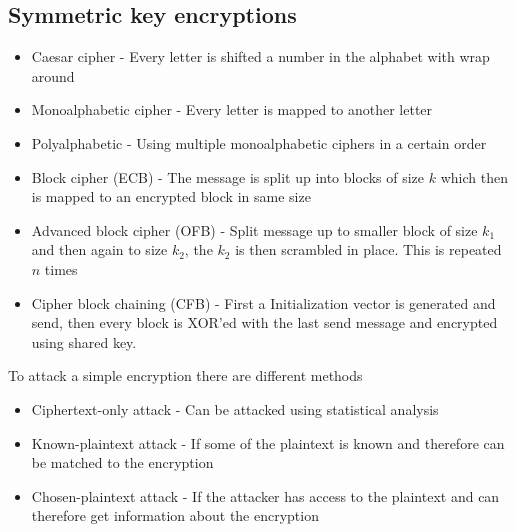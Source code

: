 \documentclass[12pt, a4paper]{article}
\begin{document}
		\subsection{Symmetric key encryptions}
			\begin{itemize}
				\item Caesar cipher - Every letter is shifted a number in the alphabet with wrap around
				\item Monoalphabetic cipher - Every letter is mapped to another letter
				\item Polyalphabetic - Using multiple monoalphabetic ciphers in a certain order
				\item Block cipher (ECB) -  The message is split up into blocks of size $k$ which then is mapped to an encrypted block in same size
				\item Advanced block cipher (OFB) - Split message up to smaller block of size $k_1$ and then again to size $k_2$, the $k_2$ is then scrambled in place. This is repeated $n$ times
				\item Cipher block chaining (CFB) - First a Initialization vector is generated and send, then every block is XOR'ed with the last send message and encrypted using shared key.
			\end{itemize}
			To attack a simple encryption there are different methods
			\begin{itemize}
				\item Ciphertext-only attack - Can be attacked using statistical analysis
				\item Known-plaintext attack - If some of the plaintext is known and therefore can be matched to the encryption
				\item Chosen-plaintext attack - If the attacker has access to the plaintext and can therefore get information about the encryption
			\end{itemize}
\end{document}
